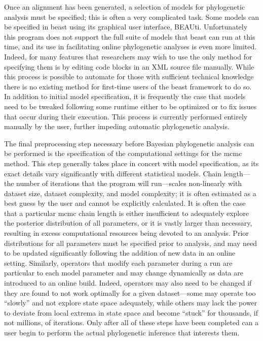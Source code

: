 Once an alignment has been generated, a selection of models for phylogenetic analysis must be specified; this is often a very complicated task.
Some models can be specified in \gls{beast} using its graphical user interface, BEAUti.
Unfortunately this program does not support the full suite of models that \gls{beast} can run at this time, and its use in facilitating online phylogenetic analyses is even more limited.
Indeed, for many features that researchers may wish to use the only method for specifying them is by editing code blocks in an XML source file manually.
While this process is possible to automate for those with sufficient technical knowledge there is no existing method for first-time users of the \gls{beast} framework to do so.
In addition to initial model specification, it is frequently the case that models need to be tweaked following some runtime either to be optimized or to fix issues that occur during their execution.
This process is currently performed entirely manually by the user, further impeding automatic phylogenetic analysis.

The final preprocessing step necessary before Bayesian phylogenetic analysis can be performed is the specification of the computational settings for the \gls{mcmc} method.
This step generally takes place in concert with model specification, as its exact details vary significantly with different statistical models.
Chain length---the number of iterations that the program will run---scales non-linearly with dataset size, dataset complexity, and model complexity; it is often estimated as a best guess by the user and cannot be explicitly calculated.
It is often the case that a particular \gls{mcmc} chain length is either insufficient to adequately explore the posterior distribution of all parameters, or it is vastly larger than necessary, resulting in excess computational resources being devoted to an analysis.
Prior distributions for all parameters must be specified prior to analysis, and may need to be updated significantly following the addition of new data in an online setting.
Similarly, operators that modify each parameter during a run are particular to each model parameter and may change dynamically as data are introduced to an online build.
Indeed, operators may also need to be changed if they are found to not work optimally for a given dataset---some may operate too ``slowly'' and not explore state space adequately, while others may lack the power to deviate from local extrema in state space and become ``stuck'' for thousands, if not millions, of iterations.
Only after all of these steps have been completed can a user begin to perform the actual phylogenetic inference that interests them.

